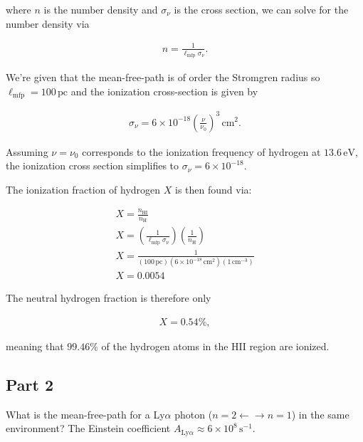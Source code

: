 \documentclass[12pt]{article}
\begin{document}
where $n$ is the number density and $\sigma_\nu$ is the cross section, we can solve for the number density via

\begin{align*}
n = \frac{1}{\ell_\mathrm{mfp}\sigma_\nu}.
\end{align*}

We're given that the mean-free-path is of order the Stromgren radius so $\ell_\mathrm{mfp} = 100\,\mathrm{pc}$ and the ionization cross-section is given by

\begin{align*}
\sigma_\nu = 6\times10^{-18}\left(\frac{\nu}{\nu_0}\right)^3\,\mathrm{cm^2}.
\end{align*}

Assuming $\nu=\nu_0$ corresponds to the ionization frequency of hydrogen at $13.6\,\mathrm{eV}$, the ionization cross section simplifies to $\sigma_\nu = 6\times10^{-18}$.

The ionization fraction of hydrogen $X$ is then found via:

\begin{align*}
X = \frac{n_\mathrm{HI}}{n_\mathrm{H}} \\
X = \left(\frac{1}{\ell_\mathrm{mfp}\sigma_\nu}\right) \left(\frac{1}{n_\mathrm{H}}\right) \\
X = \frac{1}{(100\,\mathrm{pc})(6\times10^{-18}\,\mathrm{cm^2})(1\,\mathrm{cm^{-3}})} \\
X = 0.0054
\end{align*}

The neutral hydrogen fraction is therefore only

\begin{align*}
\boxed{ X = 0.54\% },
\end{align*}

meaning that $99.46\%$ of the hydrogen atoms in the $\mathrm{HII}$ region are ionized.


\subsection*{Part 2}

What is the mean-free-path for a Ly$\alpha$ photon ($n=2 \leftarrow \rightarrow n=1$) in the same environment? The Einstein coefficient $A_{\mathrm{Ly}\alpha} \approx 6\times10^{8}\,\mathrm{s^{-1}}$.
\end{document}
